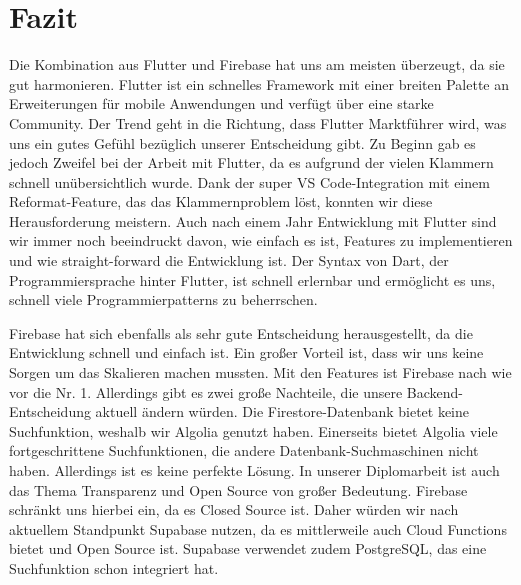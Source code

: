 \section{Fazit}
Die Kombination aus Flutter und Firebase hat uns am meisten überzeugt, da sie gut harmonieren. Flutter ist ein schnelles Framework mit einer breiten Palette an Erweiterungen für mobile Anwendungen und verfügt über eine starke Community. Der Trend geht in die Richtung, dass Flutter Marktführer wird, was uns ein gutes Gefühl bezüglich unserer Entscheidung gibt. Zu Beginn gab es jedoch Zweifel bei der Arbeit mit Flutter, da es aufgrund der vielen Klammern schnell unübersichtlich wurde. Dank der super VS Code-Integration mit einem Reformat-Feature, das das Klammernproblem löst, konnten wir diese Herausforderung meistern. Auch nach einem Jahr Entwicklung mit Flutter sind wir immer noch beeindruckt davon, wie einfach es ist, Features zu implementieren und wie straight-forward die Entwicklung ist. Der Syntax von Dart, der Programmiersprache hinter Flutter, ist schnell erlernbar und ermöglicht es uns, schnell viele Programmierpatterns zu beherrschen.

Firebase hat sich ebenfalls als sehr gute Entscheidung herausgestellt, da die Entwicklung schnell und einfach ist. Ein großer Vorteil ist, dass wir uns keine Sorgen um das Skalieren machen mussten. Mit den Features ist Firebase nach wie vor die Nr. 1. Allerdings gibt es zwei große Nachteile, die unsere Backend-Entscheidung aktuell ändern würden. Die Firestore-Datenbank bietet keine Suchfunktion, weshalb wir Algolia genutzt haben. Einerseits bietet Algolia viele fortgeschrittene Suchfunktionen, die andere Datenbank-Suchmaschinen nicht haben. Allerdings ist es keine perfekte Lösung. In unserer Diplomarbeit ist auch das Thema Transparenz und Open Source von großer Bedeutung. Firebase schränkt uns hierbei ein, da es Closed Source ist. Daher würden wir nach aktuellem Standpunkt Supabase nutzen, da es mittlerweile auch Cloud Functions bietet und Open Source ist. Supabase verwendet zudem PostgreSQL, das eine Suchfunktion schon integriert hat.



